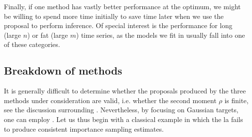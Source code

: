 Finally, if one method has vastly better performance at the optimum, we might be willing to spend more time initially to save time later when we use the proposal to perform inference. Of special interest is the performance for long (large $n$) or fat (large $m$) time series, as the models we fit in  usually fall into one of these categories.

\subsection{Breakdown of methods}

It is generally difficult to determine whether the proposals produced by the three methods under consideration are valid, i.e. whether the second moment $\rho$ is finite, see the discussion surrounding . Nevertheless, by focusing on Gaussian targets, one can employ .  Let us thus begin with a classical example in which the \gls{la} fails to produce consistent importance sampling estimates. 
